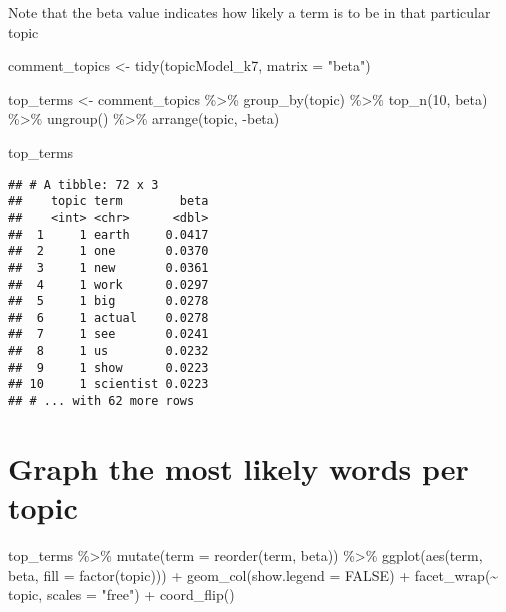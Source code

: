 \documentclass[
]{article}
\newenvironment{Shaded}{\begin{snugshade}}{\end{snugshade}}
\newcommand{\AttributeTok}[1]{\textcolor[rgb]{0.77,0.63,0.00}{#1}}
\newcommand{\ConstantTok}[1]{\textcolor[rgb]{0.00,0.00,0.00}{#1}}
\newcommand{\DecValTok}[1]{\textcolor[rgb]{0.00,0.00,0.81}{#1}}
\newcommand{\FunctionTok}[1]{\textcolor[rgb]{0.00,0.00,0.00}{#1}}
\newcommand{\NormalTok}[1]{#1}
\newcommand{\OtherTok}[1]{\textcolor[rgb]{0.56,0.35,0.01}{#1}}
\newcommand{\SpecialCharTok}[1]{\textcolor[rgb]{0.00,0.00,0.00}{#1}}
\newcommand{\StringTok}[1]{\textcolor[rgb]{0.31,0.60,0.02}{#1}}
\begin{document}
Note that the beta value indicates how likely a term is to be in that
particular topic

\begin{Shaded}
\begin{Highlighting}[]
\NormalTok{comment\_topics }\OtherTok{\textless{}{-}} \FunctionTok{tidy}\NormalTok{(topicModel\_k7, }\AttributeTok{matrix =} \StringTok{"beta"}\NormalTok{)}

\NormalTok{top\_terms }\OtherTok{\textless{}{-}}\NormalTok{ comment\_topics }\SpecialCharTok{\%\textgreater{}\%}
  \FunctionTok{group\_by}\NormalTok{(topic) }\SpecialCharTok{\%\textgreater{}\%}
  \FunctionTok{top\_n}\NormalTok{(}\DecValTok{10}\NormalTok{, beta) }\SpecialCharTok{\%\textgreater{}\%}
  \FunctionTok{ungroup}\NormalTok{() }\SpecialCharTok{\%\textgreater{}\%}
  \FunctionTok{arrange}\NormalTok{(topic, }\SpecialCharTok{{-}}\NormalTok{beta)}

\NormalTok{top\_terms}
\end{Highlighting}
\end{Shaded}

\begin{verbatim}
## # A tibble: 72 x 3
##    topic term        beta
##    <int> <chr>      <dbl>
##  1     1 earth     0.0417
##  2     1 one       0.0370
##  3     1 new       0.0361
##  4     1 work      0.0297
##  5     1 big       0.0278
##  6     1 actual    0.0278
##  7     1 see       0.0241
##  8     1 us        0.0232
##  9     1 show      0.0223
## 10     1 scientist 0.0223
## # ... with 62 more rows
\end{verbatim}

\hypertarget{graph-the-most-likely-words-per-topic}{%
\section{Graph the most likely words per
topic}\label{graph-the-most-likely-words-per-topic}}

\begin{Shaded}
\begin{Highlighting}[]
\NormalTok{top\_terms }\SpecialCharTok{\%\textgreater{}\%}
  \FunctionTok{mutate}\NormalTok{(}\AttributeTok{term =} \FunctionTok{reorder}\NormalTok{(term, beta)) }\SpecialCharTok{\%\textgreater{}\%}
  \FunctionTok{ggplot}\NormalTok{(}\FunctionTok{aes}\NormalTok{(term, beta, }\AttributeTok{fill =} \FunctionTok{factor}\NormalTok{(topic))) }\SpecialCharTok{+}
  \FunctionTok{geom\_col}\NormalTok{(}\AttributeTok{show.legend =} \ConstantTok{FALSE}\NormalTok{) }\SpecialCharTok{+}
  \FunctionTok{facet\_wrap}\NormalTok{(}\SpecialCharTok{\textasciitilde{}}\NormalTok{ topic, }\AttributeTok{scales =} \StringTok{"free"}\NormalTok{) }\SpecialCharTok{+}
  \FunctionTok{coord\_flip}\NormalTok{()}
\end{Highlighting}
\end{Shaded}
\end{document}
